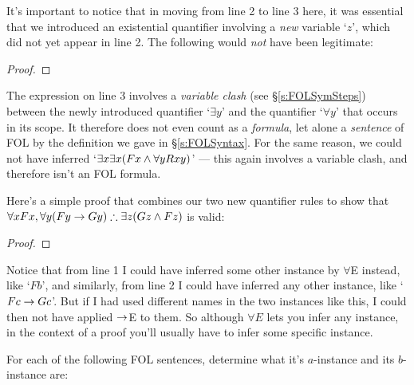 It's important to notice that in moving from line 2 to line 3 here, it was essential that we introduced an existential quantifier involving a \emph{new} variable `$z$', which did not yet appear in line 2.  The following would \emph{not} have been legitimate:

\begin{proof}
	 
	 
\end{proof}
The expression on line 3 involves a \emph{variable clash} (see \S\ref{s:FOLSymSteps}) between the newly introduced quantifier `$\exists y$' and the quantifier `$\forall y$' that occurs in its scope.  It therefore does not even count as a \emph{formula}, let alone a \emph{sentence} of FOL by the definition we gave in \S\ref{s:FOLSyntax}.  For the same reason, we could not have inferred `$\exists x\exists x(Fx \wedge \forall y Rxy)$' --- this again involves a variable clash, and therefore isn't an FOL formula.

Here's a simple proof that combines our two new quantifier rules to show that $\forall xFx,  \forall y(Fy \rightarrow Gy) \therefore \exists z(Gz \land Fz)$ is valid:
\begin{proof}
	 
	 
\end{proof}
\noindent Notice that from line 1 I could have inferred some other instance by $\forall$E instead, like `$Fb$', and similarly, from line 2 I could have inferred any other instance, like `$Fc \rightarrow Gc$'. But if I had used different names in the two instances like this, I could then not have applied $\rightarrow$E to them.  So although $\forall E$ lets you infer any instance, in the context of a proof you'll usually have to infer some specific instance.

\practiceproblems

\problempart For each of the following FOL sentences, determine what it's $a$-instance and its $b$-instance are:


